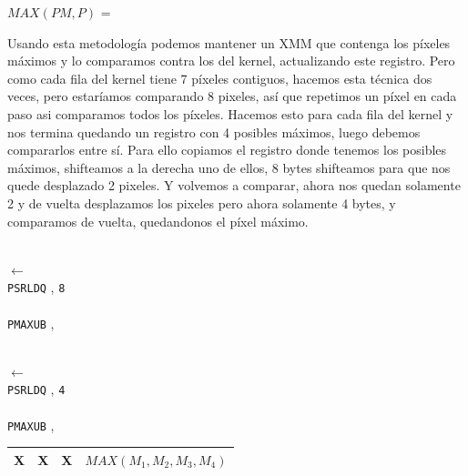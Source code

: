 $MAX(PM,P)$ = 

Usando esta metodología podemos mantener un XMM que contenga los píxeles máximos y lo comparamos contra los del kernel, actualizando este registro. Pero como cada fila del kernel tiene 7 píxeles contiguos, hacemos esta técnica dos veces, pero estaríamos comparando 8 pixeles, así que repetimos un píxel en cada paso asi comparamos todos los píxeles. Hacemos esto para cada fila del kernel y nos termina quedando un registro con 4 posibles máximos, luego debemos compararlos entre sí. Para ello copiamos el registro donde tenemos los posibles máximos, shifteamos a la derecha uno de ellos, 8 bytes shifteamos para que nos quede desplazado 2 pixeles. Y volvemos a comparar, ahora nos quedan solamente 2 y de vuelta desplazamos los pixeles pero ahora solamente 4 bytes, y comparamos de vuelta, quedandonos el píxel máximo.

\begin{center}
  \\
 $\leftarrow$  \\
\texttt{PSRLDQ} , \texttt{8} \hfill \\
  \\

\texttt{PMAXUB} ,  \hfill

  \\

 $\leftarrow$  \\
\texttt{PSRLDQ} , \texttt{4} \hfill \\
  \\

\texttt{PMAXUB} ,  \hfill \\

 \vspace{0.1cm}
\begin{tabular}{|C{1cm}|C{1cm}|C{1cm}|C{3.8cm}|}\hline
X & X & X & $MAX(M_1,M_2,M_3,M_4)$ \\ \hline
\end{tabular}
\vspace{0.1cm}

\end{center}

